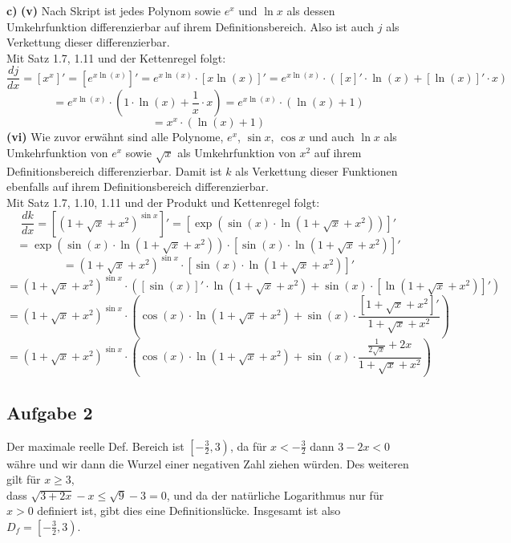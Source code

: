 \documentclass[a4paper,graphics,11pt]{article}
\newcommand{\aufgabe}[1]{\subsection*{Aufgabe #1}}
\begin{document}
\textbf{c)}
\textbf{(v)}
Nach Skript ist jedes Polynom sowie $e^x$ und $\ln x$ als dessen Umkehrfunktion differenzierbar auf ihrem
Definitionsbereich. Also ist auch $j$ als Verkettung dieser differenzierbar.\\
Mit Satz 1.7, 1.11 und der Kettenregel folgt:
$$
    \frac{dj}{dx} = [x^x]' = \left[e^{x\ln(x)}\right]'
    = e^{x\ln(x)} \cdot [x\ln(x)]'
    = e^{x\ln(x)} \cdot ([x]' \cdot \ln(x) + [\ln(x)]' \cdot x)
$$$$
    = e^{x\ln(x)} \cdot (1 \cdot \ln(x) + \frac{1}{x} \cdot x)
    = e^{x\ln(x)} \cdot (\ln(x) + 1)
$$$$
    = x^x \cdot (\ln(x) + 1)
$$
\newpage
\textbf{(vi)}
Wie zuvor erwähnt sind alle Polynome, $e^x$, $\sin x$, $\cos x$ und auch $\ln x$ als Umkehrfunktion von $e^x$
sowie $\sqrt{x}$ als Umkehrfunktion von $x^2$ auf ihrem Definitionsbereich differenzierbar.
Damit ist $k$ als Verkettung dieser Funktionen ebenfalls auf ihrem Definitionsbereich differenzierbar.\\
Mit Satz 1.7, 1.10, 1.11 und der Produkt und Kettenregel folgt:
$$
    \frac{dk}{dx} = \left[\left(1 + \sqrt{x} + x^2\right)^{\sin x}\right]'
    = \left[\exp\left(\sin(x)\cdot \ln\left(1 + \sqrt{x} + x^2\right)\right) \right]'
$$$$
    = \exp\left(\sin(x)\cdot \ln\left(1 + \sqrt{x} + x^2\right)\right)
        \cdot \left[\sin(x)\cdot \ln\left(1 + \sqrt{x} + x^2\right)\right]'
$$$$
    = \left(1+\sqrt{x} + x^2\right)^{\sin x}
        \cdot \left[\sin(x)\cdot \ln\left(1 + \sqrt{x} + x^2\right)\right]'
$$$$
    = \left(1+\sqrt{x} + x^2\right)^{\sin x}
        \cdot \left([\sin(x)]'\cdot \ln\left(1 + \sqrt{x} + x^2\right)
        + \sin(x) \cdot \left[\ln\left(1+\sqrt{x} + x^2\right)\right]'\right)
$$$$
    = \left(1+\sqrt{x} + x^2\right)^{\sin x}
        \cdot \left(\cos(x)\cdot \ln\left(1 + \sqrt{x} + x^2\right)
        + \sin(x) \cdot \frac{[1+\sqrt{x}+x^2]'}{1+\sqrt{x} + x^2}\right)
$$$$
    = \left(1+\sqrt{x} + x^2\right)^{\sin x}
        \cdot \left(\cos(x)\cdot \ln\left(1 + \sqrt{x} + x^2\right)
        + \sin(x) \cdot \frac{\frac{1}{2\sqrt{x}}+2x}{1+\sqrt{x} + x^2}\right)
$$
\newpage

\aufgabe{2}
Der maximale reelle Def. Bereich ist $\left[-\frac{3}{2} , 3\right)$, da für $x < - \frac{3}{2}$ dann
$3 - 2x < 0$ währe und wir dann die Wurzel einer negativen Zahl ziehen würden.
Des weiteren gilt für $x \geq 3$,\\ dass $\sqrt{3+2x} - x \leq \sqrt{9} - 3= 0$, und da
der natürliche Logarithmus nur für $x > 0$ definiert ist, gibt dies eine Definitionslücke.
Insgesamt ist also $D_f = \left[-\frac{3}{2}, 3\right)$.
\end{document}

